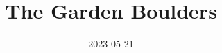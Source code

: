 \documentclass[10pt, twoside]{report}
\begin{document}
\title{The Garden Boulders}
\date{2023-05-21}
\maketitle
\shipout\null

\newcommand\chapterColor{MidnightBlue}

\renewcommand\chapterColor{BrickRed}

\renewcommand\chapterColor{RoyalPurple}

\renewcommand\chapterColor{BurntOrange}

\renewcommand\chapterColor{Aquamarine}

\renewcommand\chapterColor{RubineRed}

\renewcommand\chapterColor{MidnightBlue}

\end{document}
